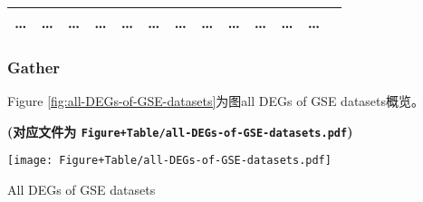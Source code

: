 \documentclass[
]{article}
\begin{document}
\begin{longtable}[]{@{}lllllllllllll@{}}
\begin{minipage}[t]{0.05\columnwidth}
\ldots{}\strut
\end{minipage} & \begin{minipage}[t]{0.05\columnwidth}\raggedright
\ldots{}\strut
\end{minipage} & \begin{minipage}[t]{0.05\columnwidth}\raggedright
\ldots{}\strut
\end{minipage} & \begin{minipage}[t]{0.05\columnwidth}\raggedright
\ldots{}\strut
\end{minipage} & \begin{minipage}[t]{0.05\columnwidth}\raggedright
\ldots{}\strut
\end{minipage} & \begin{minipage}[t]{0.05\columnwidth}\raggedright
\ldots{}\strut
\end{minipage} & \begin{minipage}[t]{0.05\columnwidth}\raggedright
\ldots{}\strut
\end{minipage} & \begin{minipage}[t]{0.05\columnwidth}\raggedright
\ldots{}\strut
\end{minipage} & \begin{minipage}[t]{0.05\columnwidth}\raggedright
\ldots{}\strut
\end{minipage} & \begin{minipage}[t]{0.05\columnwidth}\raggedright
\ldots{}\strut
\end{minipage} & \begin{minipage}[t]{0.05\columnwidth}\raggedright
\ldots{}\strut
\end{minipage} & \begin{minipage}[t]{0.02\columnwidth}\raggedright
\ldots{}\strut
\end{minipage}\tabularnewline
\bottomrule
\end{longtable}

\hypertarget{gather}{%
\subsubsection{Gather}\label{gather}}

Figure \ref{fig:all-DEGs-of-GSE-datasets}为图all DEGs of GSE datasets概览。

\textbf{(对应文件为 \texttt{Figure+Table/all-DEGs-of-GSE-datasets.pdf})}

\def\@captype{figure}
\begin{center}
\texttt{[image: Figure+Table/all-DEGs-of-GSE-datasets.pdf]}
\caption{All DEGs of GSE datasets}\label{fig:all-DEGs-of-GSE-datasets}
\end{center}
\end{document}
